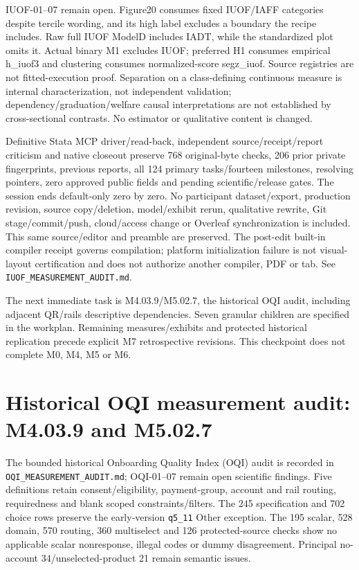 \documentclass[11pt,a4paper]{article}
\begin{document}
IUOF-01--07 remain open. Figure20 consumes fixed IUOF/IAFF categories
despite tercile wording, and its high label excludes a boundary the recipe
includes. Raw full IUOF ModelD includes IADT, while the standardized plot
omits it. Actual binary M1 excludes IUOF; preferred H1 consumes empirical
h\_iuof3 and clustering consumes normalized-score segz\_iuof. Source
registries are not fitted-execution proof. Separation on a class-defining
continuous measure is internal characterization, not independent
validation; dependency/graduation/welfare causal interpretations are not
established by cross-sectional contrasts. No estimator or qualitative
content is changed.

Definitive Stata MCP driver/read-back, independent source/receipt/report
criticism and native closeout preserve 768 original-byte checks, 206 prior
private fingerprints, previous reports, all 124 primary tasks/fourteen
milestones, resolving pointers, zero approved public fields and pending
scientific/release gates. The session ends default-only zero by zero.
No participant dataset/export, production revision, source copy/deletion,
model/exhibit rerun, qualitative rewrite, Git stage/commit/push, cloud/access
change or Overleaf synchronization is included. This same source/editor
and preamble are preserved. The post-edit built-in compiler receipt
governs compilation; platform initialization failure is not visual-layout
certification and does not authorize another compiler, PDF or tab.
See \texttt{IUOF\_MEASUREMENT\_AUDIT.md}.

The next immediate task is M4.03.9/M5.02.7, the historical OQI audit,
including adjacent QR/rails descriptive dependencies. Seven granular
children are specified in the workplan. Remaining measures/exhibits and
protected historical replication precede explicit M7 retrospective
revisions. This checkpoint does not complete M0, M4, M5 or M6.

\section{Historical OQI measurement audit: M4.03.9 and M5.02.7}
The bounded historical Onboarding Quality Index (OQI) audit is recorded in
\texttt{OQI\_MEASUREMENT\_AUDIT.md}; OQI-01--07 remain open scientific findings.
Five definitions retain consent/eligibility, payment-group, account and rail
routing, requiredness and blank scoped constraints/filters. The 245 specification
and 702 choice rows preserve the early-version \texttt{q5\_11} Other exception.
The 195 scalar, 528 domain, 570 routing, 360 multiselect and 126 protected-source
checks show no applicable scalar nonresponse, illegal codes or dummy disagreement.
Principal no-account 34/unselected-product 21 remain semantic issues.
\end{document}
